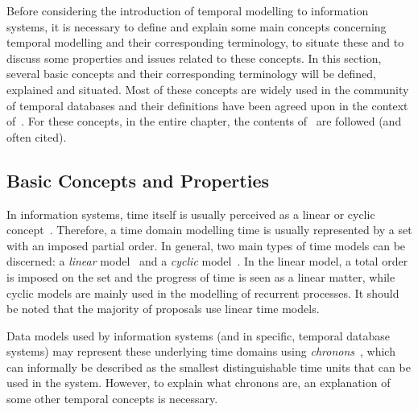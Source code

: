 %
%
Before considering the introduction of temporal modelling to information systems, it is necessary to define and explain some main concepts concerning temporal modelling and their corresponding terminology, to situate these and to discuss some properties and issues related to these concepts. In this section, several basic concepts and their corresponding terminology will be defined, explained and situated. Most of these concepts are widely used in the community of temporal databases and their definitions have been agreed upon in the context of~\cite{Dyreson1994}. For these concepts, in the entire chapter, the contents of~\cite{Dyreson1994} are followed (and often cited).





\subsection{Basic Concepts and Properties}
\label{subsec:basic-concepts}
In information systems, time itself is usually perceived as a linear or cyclic concept~\cite{Jensen94thetsql2}. Therefore, a time domain modelling time is usually represented by a set with an imposed partial order. In general, two main types of time models can be discerned: a \emph{linear} model~\cite{benthem82} and a \emph{cyclic} model~\cite{lorentzos88}. In the linear model, a total order is imposed on the set and the progress of time is seen as a linear matter, while cyclic models are mainly used in the modelling of recurrent processes. It should be noted that the majority of proposals use linear time models.

Data models used by information systems (and in specific, temporal database systems) may represent these underlying time domains using \emph{chronons}~\cite{Dyreson1994}, which can informally be described as the smallest distinguishable time units that can be used in the system. However, to explain what chronons are, an explanation of some other temporal concepts is necessary.

